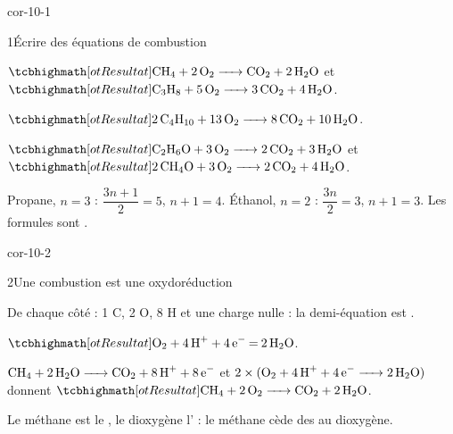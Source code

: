 \corrigesSouples

\begin{blocLivre}{cor-10-1}
\begin{corrige}{1}{Écrire des équations de combustion}
\begin{questions}
\item $\res{\ce{CH4 + 2O2 -> CO2 + 2H2O}}$ et $\res{\ce{C3H8 + 5O2 -> 3CO2 + 4H2O}}$.
\item $\res{\ce{2C4H10 + 13O2 -> 8CO2 + 10H2O}}$.
\item $\res{\ce{C2H6O + 3O2 -> 2CO2 + 3H2O}}$ et $\res{\ce{2CH4O + 3O2 -> 2CO2 + 4H2O}}$.
\item Propane, $n=3$ : $\dfrac{3n+1}{2}=5$, $n+1=4$. Éthanol, $n=2$ : $\dfrac{3n}{2}=3$, $n+1=3$. Les formules sont .
\end{questions}
\end{corrige}
\end{blocLivre}
\begin{blocLivre}{cor-10-2}
\begin{corrige}{2}{Une combustion est une oxydoréduction}
\begin{questions}
\item De chaque côté : 1 C, 2 O, 8 H et une charge nulle : la demi-équation est .
\item $\res{\ce{O2 + 4H+ + 4e- = 2H2O}}$.
\item $\ce{CH4 + 2H2O -> CO2 + 8H+ + 8e-}$ et $2\times(\ce{O2 + 4H+ + 4e- -> 2H2O})$ donnent $\res{\ce{CH4 + 2O2 -> CO2 + 2H2O}}$.
\item Le méthane est le , le dioxygène l' : le méthane cède des  au dioxygène.
\end{questions}
\end{corrige}
\end{blocLivre}
